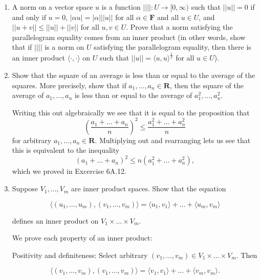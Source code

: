 \documentclass{book}
\begin{document}
\begin{enumerate}
\item A norm on a vector space \(u\) is a function \(|| ||:U \rightarrow [0,\infty)\) such that \(||u||=0\) if and only if \(u=0\), \(|\alpha u|=|\alpha|||u||\) for all \(\alpha \in \textbf{F}\) and all \(u \in U\), and \(||u+v|| \leq ||u||+||v||\) for all \(u,v \in U\).  Prove that a norm satisfying the parallelogram equality comes from an inner product (in other words, show that if \(||||\) is a norm on \(U\) satisfying the parallelogram equality, then there is an inner product \(\langle \cdot,\cdot \rangle\) on \(U\) such that \(||u||=\langle u,u \rangle^\frac{1}{2}\) for all \(u \in U\)).


\item Show that the square of an average is less than or equal to the average of the squares.  More precisely, show that if \(a_1,\dots,a_n \in \textbf{R}\), then the square of the average of \(a_1,\dots,a_n\) is less than or equal to the average of \(a_1^2,\dots,a_n^2\).

Writing this out algebraically we see that it is equal to the proposition that \[(\frac{a_1+\dots+a_n}{n})^2 \leq \frac{a_1^2+\dots+a_n^2}{n}\] for arbitrary \(a_1,\dots,a_n \in \textbf{R}\).  Multiplying out and rearranging lets us see that this is equivalent to the inequality \[(a_1+\dots+a_n)^2 \leq n(a_1^2+\dots+a_n^2),\] which we proved in Excercise 6A.12.

\item Suppose \(V_1,\dots,V_m\) are inner product spaces.  Show that the equation

\begin{equation*}
    \langle (u_1,\dots,u_m),(v_1,\dots,v_m) \rangle = \langle u_1,v_1 \rangle + \dots + \langle u_m,v_m \rangle
\end{equation*}

defines an inner product on \(V_1 \times \dots \times V_m\).

We prove each property of an inner product:

Positivity and definiteness: Select arbitrary \((v_1,\dots,v_m) \in V_1 \times \dots \times V_m\).  Then

\begin{equation*}
    \langle (v_1,\dots,v_m), (v_1,\dots,v_m) \rangle = \langle v_1,v_1 \rangle + \dots + \langle v_m,v_m \rangle.
\end{equation*}


\end{enumerate}
\end{document}
